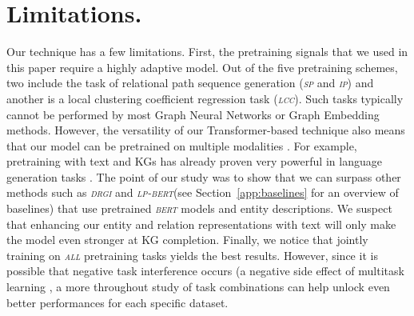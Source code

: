 \documentclass{article}
\newcommand{\lpbert}{\textsl{\textsc{lp-bert}}\xspace}
\newcommand{\drgi}{\textsl{\textsc{drgi}}\xspace}
\newcommand{\bert}{\textsl{\textsc{bert}}\xspace}
\newcommand{\spa}{\textsl{\textsc{sp}}\xspace}
\newcommand{\ipa}{\textsl{\textsc{ip}}\xspace}
\newcommand{\lcc}{\textsl{\textsc{lcc}}\xspace}
\newcommand{\all}{\textsl{\textsc{all}}\xspace}
\begin{document}
\section*{Limitations.} Our technique has a few limitations. 
First, the pretraining signals that we used in this paper require a highly adaptive model. 
Out of the five pretraining schemes, two include the task of relational path sequence generation (\spa and \ipa) and another is a local clustering coefficient regression task (\lcc). 
Such tasks typically cannot be performed by most Graph Neural Networks or Graph Embedding methods. 
However, the versatility of our Transformer-based technique also means that our model can be pretrained on multiple modalities \cite{limoe2022,multigametrf2022}. 
For example, pretraining with text and KGs has already proven very powerful in language generation tasks \cite{agarwal-etal-2021-knowledge}. 
The point of our study was to show that we can surpass other methods such as \drgi and \lpbert (see  Section~\ref{app:baselines} for an overview of baselines) that use pretrained \bert models and entity descriptions. 
We suspect that enhancing our entity and relation representations with text will only make the model even stronger at KG completion. 
Finally, we notice that jointly training on \all pretraining tasks yields the best results. However, since it is possible that negative task interference occurs (a negative side effect of multitask learning \cite{negtrans2020,pilault2021conditionally}, a more throughout study of task combinations can help unlock even better performances for each specific dataset.

\clearpage












\clearpage
\end{document}
